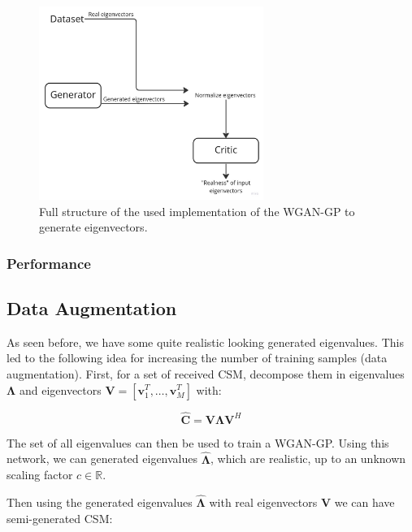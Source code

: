\documentclass{article}
\begin{document}
\begin{figure}
    \centering
    \includegraphics[width=0.65\textwidth]{../figs/evecs_wgangp_full_structure.jpg}
    \caption{Full structure of the used implementation of the WGAN-GP to generate eigenvectors.}
    \label{fig:evecs_wgangp_full_structure}
\end{figure}

\subsubsection{Performance} 



\subsection{Data Augmentation}

As seen before, we have some quite realistic looking generated eigenvalues. This led to the following idea for increasing the number of training samples (data augmentation). First, for a set of received CSM, decompose them in eigenvalues $\mathbf{\Lambda}$  and eigenvectors $\mathbf{V} = [\mathbf{v}_1^T, \dots, \mathbf{v}_M^T]$ with:

\begin{equation}
    \mathbf{\hat{C}} = \mathbf{V} \mathbf{\Lambda} \mathbf{V}^H
\end{equation}


The set of all eigenvalues can then be used to train a WGAN-GP. Using this network, we can generated eigenvalues $\hat{\mathbf{\Lambda}}$, which are realistic, up to an unknown scaling factor $c \in \mathbb{R}$.  


Then using the generated eigenvalues $\hat{\mathbf{\Lambda}}$ with real eigenvectors $\mathbf{V}$ we can have semi-generated CSM:
\end{document}
